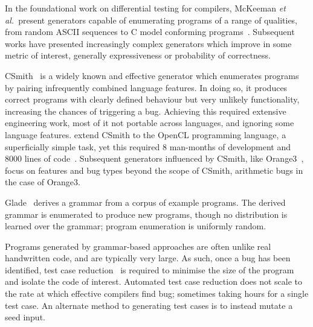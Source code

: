 In the foundational work on differential testing for compilers, McKeeman \emph{et al.\ }present generators capable of enumerating programs of a range of qualities, from random ASCII sequences to C model conforming programs~\cite{McKeeman1998}. Subsequent works have presented increasingly complex generators which improve in some metric of interest, generally expressiveness or probability of correctness.

CSmith~\cite{Yang2011} is a widely known and effective generator which enumerates programs by pairing infrequently combined language features. In doing so, it produces correct programs with clearly defined behaviour but very unlikely functionality, increasing the chances of triggering a bug. Achieving this required extensive engineering work, most of it not portable across languages, and ignoring some language features.
\citeauthor{Lidbury2015a} extend CSmith to the OpenCL programming language, a superficially simple task, yet this required 8 man-months of development and 8000 lines of code~\cite{Lidbury2015a}.
Subsequent generators influenced by CSmith, like Orange3~\cite{Nagai2013}, focus on features and bug types beyond the scope of CSmith, arithmetic bugs in the case of Orange3.

Glade~\cite{Bastani2017} derives a grammar from a corpus of example programs. The derived grammar is enumerated to produce new programs, though no distribution is learned over the grammar; program enumeration is uniformly random.

Programs generated by grammar-based approaches are often unlike real handwritten code, and are typically very large. As such, once a bug has been identified, test case reduction~\cite{Regehr2012a} is required to minimise the size of the program and isolate the code of interest. Automated test case reduction does not scale to the rate at which effective compilers find bug; sometimes taking hours for a single test case. An alternate method to generating test cases is to instead mutate a seed input.


